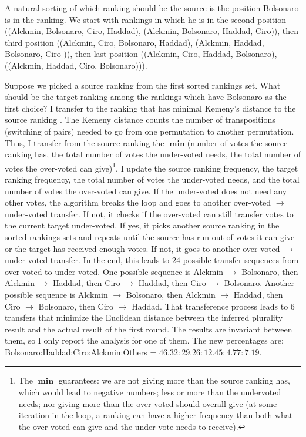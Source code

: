 \documentclass[hidelinks,11pt]{article} \usepackage[utf8]{inputenc}
\begin{document}
A natural sorting of which ranking should be the source is the position
Bolsonaro is in the ranking. We start with rankings in which he is in the second
position ((Alckmin, Bolsonaro, Ciro, Haddad), (Alckmin, Bolsonaro, Haddad,
Ciro)), then third position ((Alckmin, Ciro, Bolsonaro, Haddad), (Alckmin,
Haddad, Bolsonaro, Ciro )), then last position ((Alckmin, Ciro, Haddad,
Bolsonaro), ((Alckmin, Haddad, Ciro, Bolsonaro))).

Suppose we picked a source ranking from the first sorted rankings set. What
should be the target ranking among the rankings which have Bolsonaro as the
first choice? I transfer to the ranking that has minimal Kemeny's distance to
the source ranking \parencite{nurmi2002voting}. The Kemeny distance counts the
number of transpositions (switching of pairs) needed to go from one permutation
to another permutation. Thus, I transfer from the source ranking the
\(\operatorname{\mathbf{min}}\)(number of votes the source ranking has, the
total number of votes the under-voted needs, the total number of votes the
over-voted can give)\footnote{The \(\operatorname{\mathbf{min}}\) guarantees: we
are not giving more than the source ranking has, which would lead to negative
numbers; less or more than the undervoted needs; nor giving more than the
over-voted should overall give (at some iteration in the loop, a ranking can
have a higher frequency than both what the over-voted can give and the
under-vote needs to receive).}. I update the source ranking frequency, the
target ranking frequency, the total number of votes the under-voted needs, and
the total number of votes the over-voted can give. If the under-voted does not
need any other votes, the algorithm breaks the loop and goes to another
over-voted \(\to\) under-voted transfer. If not, it checks if the over-voted can
still transfer votes to the current target under-voted. If yes, it picks another
source ranking in the sorted rankings sets and repeats until the source has run
out of votes it can give or the target has received enough votes. If not, it
goes to another over-voted \(\to\) under-voted transfer. In the end, this leads
to 24 possible transfer sequences from over-voted to under-voted. One possible
sequence is Alckmin \(\to\) Bolsonaro, then Alckmin \(\to\) Haddad, then Ciro
\(\to\) Haddad, then Ciro \(\to\) Bolsonaro. Another possible sequence is
Alckmin \(\to\) Bolsonaro, then Alckmin \(\to\) Haddad, then Ciro \(\to\)
Bolsonaro, then Ciro \(\to\) Haddad. That transference process leads to 6
transfers that minimize the Euclidean distance between the inferred plurality
result and the actual result of the first round. The results are invariant
between them, so I only report the analysis for one of them. The new percentages
are: Bolsonaro:Haddad:Ciro:Alckmin:Others = \(46.32:29.26:12.45:4.77:7.19 \).
\end{document}
